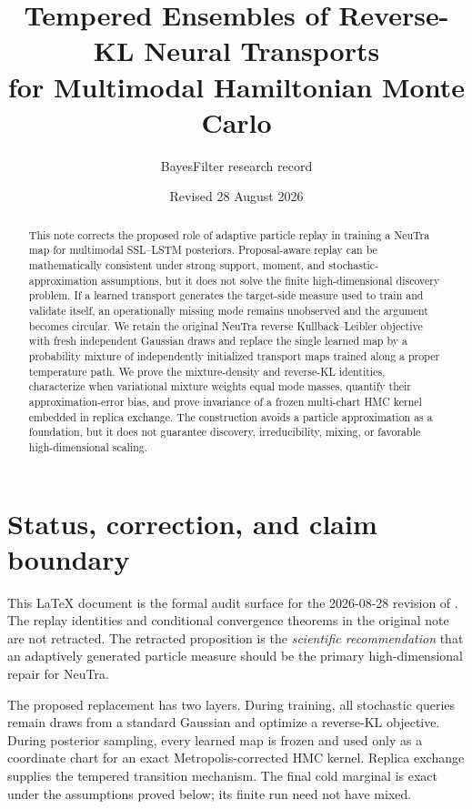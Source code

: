 \documentclass[11pt]{article}
\title{Tempered Ensembles of Reverse-KL Neural Transports\\
for Multimodal Hamiltonian Monte Carlo}
\author{BayesFilter research record}
\date{Revised 28 August 2026}
\theoremstyle{definition}
\theoremstyle{remark}
\newcommand{\1}{\mathbf{1}}
\begin{document}
\maketitle

\begin{abstract}
This note corrects the proposed role of adaptive particle replay in training a
NeuTra map for multimodal SSL--LSTM posteriors.  Proposal-aware replay can be
mathematically consistent under strong support, moment, and stochastic-
approximation assumptions, but it does not solve the finite high-dimensional
discovery problem.  If a learned transport generates the target-side measure
used to train and validate itself, an operationally missing mode remains
unobserved and the argument becomes circular.  We retain the original NeuTra
reverse Kullback--Leibler objective with fresh independent Gaussian draws and
replace the single learned map by a probability mixture of independently
initialized transport maps trained along a proper temperature path.  We prove
the mixture-density and reverse-KL identities, characterize when variational
mixture weights equal mode masses, quantify their approximation-error bias,
and prove invariance of a frozen multi-chart HMC kernel embedded in replica
exchange.  The construction avoids a particle approximation as a foundation,
but it does not guarantee discovery, irreducibility, mixing, or favorable
high-dimensional scaling.
\end{abstract}

\section{Status, correction, and claim boundary}

This LaTeX document is the formal audit surface for the 2026-08-28 revision of
.
The replay identities and conditional convergence theorems in
the original note are not retracted.  The retracted proposition is the
\emph{scientific recommendation} that an adaptively generated particle measure
should be the primary high-dimensional repair for NeuTra.

The proposed replacement has two layers.  During training, all stochastic
queries remain draws from a standard Gaussian and optimize a reverse-KL
objective.  During posterior sampling, every learned map is frozen and used
only as a coordinate chart for an exact Metropolis-corrected HMC kernel.
Replica exchange supplies the tempered transition mechanism.  The final cold
marginal is exact under the assumptions proved below; its finite run need not
have mixed.
\end{document}
